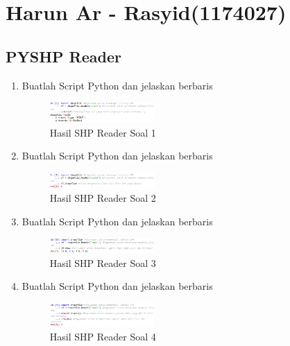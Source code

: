\section{Harun Ar - Rasyid(1174027)}
\subsection{PYSHP Reader}
\begin{enumerate}
    \item Buatlah Script Python dan jelaskan berbaris
    
    \hfill\break
    \begin{figure}[H]
		\includegraphics[width=4cm]{figures/1174027/3/soal1.png}
		\centering
		\caption{Hasil SHP Reader Soal 1}
    \end{figure}
    
    \item Buatlah Script Python dan jelaskan berbaris
    
    \hfill\break
    \begin{figure}[H]
		\includegraphics[width=4cm]{figures/1174027/3/soal2.png}
		\centering
		\caption{Hasil SHP Reader Soal 2}
    \end{figure}
    
    \item Buatlah Script Python dan jelaskan berbaris
    
    \hfill\break
    \begin{figure}[H]
		\includegraphics[width=4cm]{figures/1174027/3/soal3.png}
		\centering
		\caption{Hasil SHP Reader Soal 3}
    \end{figure}
    
    \item Buatlah Script Python dan jelaskan berbaris
    
    \hfill\break
    \begin{figure}[H]
		\includegraphics[width=4cm]{figures/1174027/3/soal4.png}
		\centering
		\caption{Hasil SHP Reader Soal 4}
    \end{figure}
    

\end{enumerate}
